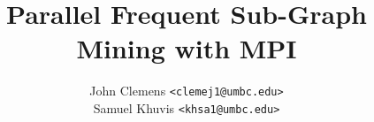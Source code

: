 \documentclass{article}
\title{Parallel Frequent Sub-Graph Mining with MPI}
\author{John Clemens \texttt{<clemej1@umbc.edu>} \\
	Samuel Khuvis \texttt{<khsa1@umbc.edu>}}
\begin{document}
\maketitle







{}

\end{document}
